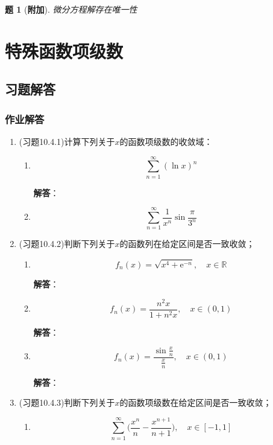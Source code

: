 \documentclass[a4paper,UTF8,fontset=windows,AutoFakeBold]{ctexart}
\newcommand*{\er}{\mathrm{e}}
\newcommand*{\rb}{\mathbb{R}}
\newcommand*{\suminf}[1][n=1]{\sum_{#1}^\infty}
\newcommand*{\extra}{\textbf{附加}}
\theoremstyle{ex}
\newtheorem{exercise}{题}
\newcommand{\sol}[1]{{\vspace{5pt}\kaishu\noindent\textbf{解答}：\vspace{-3pt}
\begin{compactitem}
    \item[] #1
\end{compactitem}
}}
\begin{document}
\begin{framed}
\begin{exercise}[\extra]
    微分方程解存在唯一性    
\end{exercise}
\end{framed}

\newpage
\section{特殊函数项级数}
\subsection{习题解答}
\subsubsection{作业解答}
\begin{enumerate}
    \item (习题10.4.1)计算下列关于$x$的函数项级数的收敛域：
    \begin{enumerate}
        \item[(1)] $$\suminf(\ln x)^n$$
        
        \sol{

        }

        \item[(3)] $$\suminf\frac{1}{x^n}\sin\frac{\pi}{3^n}$$
    \end{enumerate}

    \item (习题10.4.2)判断下列关于$x$的函数列在给定区间是否一致收敛；
    \begin{enumerate}
        \item[(2)] $$f_n(x)=\sqrt{x^4+\er^{-n}},\quad x\in\rb$$
        
        \sol{

        }

        \item[(4)] $$f_n(x)=\frac{n^2x}{1+n^2x},\quad x\in(0,1)$$
        
        \sol{

        }

        \item[(6)] $$f_n(x)=\frac{\sin\frac{x}{n}}{\frac{x}{n}},\quad x\in(0,1)$$
        
        \sol{

        }
    \end{enumerate}

    \item (习题10.4.3)判断下列关于$x$的函数项级数在给定区间是否一致收敛；
    \begin{enumerate}
        \item[(2)] $$\suminf\bigg(\frac{x^n}{n}-\frac{x^{n+1}}{n+1}\bigg),\quad x\in[-1,1]$$
        

\end{enumerate}
\end{enumerate}
\end{document}
